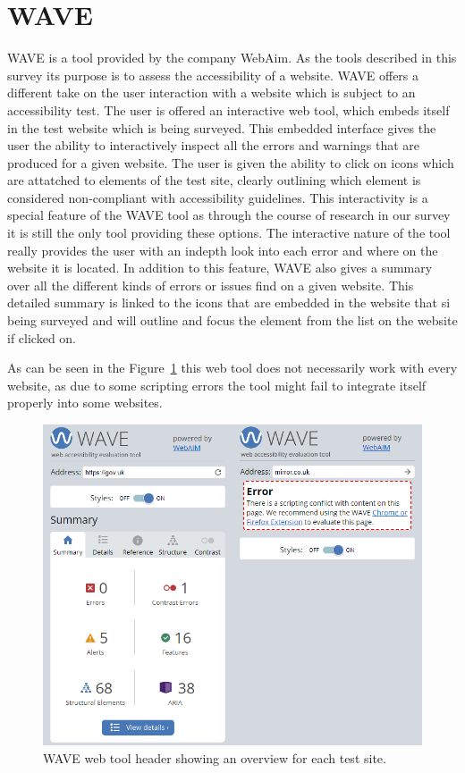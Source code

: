 \section{WAVE}

WAVE \parencite{WAVE_web} is a tool provided by the company WebAim. As
the tools described in this survey its purpose is to assess the
accessibility of a website. WAVE offers a different take on the user
interaction with a website which is subject to an accessibility
test. The user is offered an interactive web tool, which embeds itself
in the test website which is being surveyed.  This embedded interface
gives the user the ability to interactively inspect all the errors and
warnings that are produced for a given website. The user is given the
ability to click on icons which are attatched to elements of the test
site, clearly outlining which element is considered non-compliant with
accessibility guidelines. This interactivity is a special feature of
the WAVE tool as through the course of research in our survey it is
still the only tool providing these options. The interactive nature of
the tool really provides the user with an indepth look into each error
and where on the website it is located. In addition to this feature,
WAVE also gives a summary over all the different kinds of errors or
issues find on a given website. This detailed summary is linked to the
icons that are embedded in the website that si being surveyed and will
outline and focus the element from the list on the website if clicked
on.

As can be seen in the Figure~\ref{fig:WAVE} this web tool does
not necessarily work with every website, as due to some scripting
errors the tool might fail to integrate itself properly into some
websites.


\begin{figure}[h!]
\centering
\includegraphics[keepaspectratio,width=\linewidth,height=\halfh]
{images/WAVE.png}

\caption[WAVE Overview]
{%
WAVE web tool header showing an overview for each test site.
}
\label{fig:WAVE}
\end{figure}



